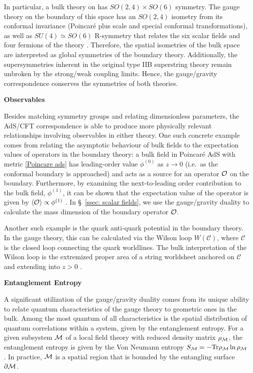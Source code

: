 \documentclass[../PhD.tex]{subfiles}
\begin{document}
In particular, a bulk theory on \ads has $SO(2,4)\times SO(6)$ symmetry. The gauge theory on the boundary of this space has an $SO(2,4)$ isometry from its conformal invariance (Poincar\'e plus scale and special conformal transformations), as well as $SU(4) \simeq SO(6)$ R-symmetry that relates the six scalar fields and four fermions of the theory \cite{1501.00007}. Therefore, the spatial isometries of the bulk space are interpreted as global symmetries of the boundary theory. Additionally, the supersymmetries inherent in the original type IIB superstring theory remain unbroken by the strong/weak coupling limits. Hence, the gauge/gravity correspondence conserves the symmetries of both theories.

{\bf Observables}

Besides matching symmetry groups and relating dimensionless parameters, the AdS/CFT correspondence is able to produce more physically relevant relationships involving observables in either theory. One such concrete example comes from relating the asymptotic behaviour of bulk fields to the expectation values of operators in the boundary theory: a bulk field in Poincar\'e AdS with metric \eqref{Poincare ads} has leading-order value $\phi^{(0)}$ as $z \to 0$ (i.e.~as the conformal boundary is approached) and acts as a source for an operator $\mathcal O$ on the boundary. Furthermore, by examining the next-to-leading order contribution to the bulk field, $\phi^{(1)}$, it can be shown that the expectation value of the operator is given by $\langle \mathcal O \rangle \propto \phi^{(1)}$ \cite{hep-th/9905104}. In \S~\!\ref{ssec: scalar fields}, we use the gauge/gravity duality to calculate the mass dimension of the boundary operator $\mathcal O$.

Another such example is the quark anti-quark potential in the boundary theory. In the gauge theory, this can be calculated via the Wilson loop $W(\mathcal C)$, where $\mathcal C$ is the closed loop connecting the quark worldlines. The bulk interpretation of the Wilson loop is the extremized proper area of a string worldsheet anchored on $\mathcal C$ and extending into $z > 0$ \cite{hep-th/9803002}. 

{\bf Entanglement Entropy}

A significant utilization of the gauge/gravity duality comes from its unique ability to relate quantum characteristics of the gauge theory to geometric ones in the bulk. Among the most quantum of all characteristics is the spatial distribution of quantum correlations within a system, given by the entanglement entropy. For a given subsystem $\mathcal M$ of a local field theory with reduced density matrix $\rho_{\mathcal M}$, the entanglement entropy is given by the Von Neumann entropy $S_{\mathcal M} = - \text{Tr} \rho_{\mathcal M} \ln \rho_{\mathcal M}$. In practice, $\mathcal M$ is a spatial region that is bounded by the entangling surface $\partial \mathcal M$.
\end{document}
